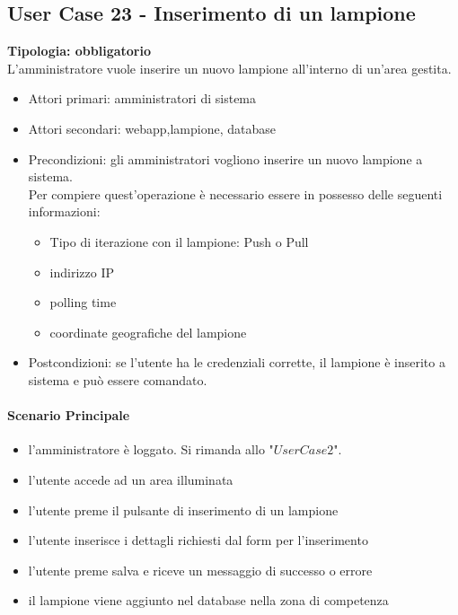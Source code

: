 \documentclass[12pt]{article}
\begin{document}
\subsection{User Case 23 - Inserimento di un lampione}
\textbf{Tipologia: obbligatorio}\\
L'amministratore vuole inserire un nuovo lampione all'interno di un'area gestita.
\begin{itemize}
	\item Attori primari: amministratori di sistema
	\item Attori secondari: webapp,lampione, database
	\item Precondizioni: gli amministratori vogliono inserire un nuovo lampione a sistema.\\
	 Per compiere quest'operazione è necessario essere in possesso delle seguenti informazioni: 
	\begin{itemize}
		\item Tipo di iterazione con il lampione: Push o Pull
		\item indirizzo IP
		\item polling time
		\item coordinate geografiche del lampione
	\end{itemize}
	\item Postcondizioni: se l'utente ha le credenziali corrette, il lampione è inserito a sistema e può essere comandato.
\end{itemize}
\paragraph{Scenario Principale}
\begin{itemize}
	\item l'amministratore è loggato. Si rimanda allo "$User Case 2$".
	\item l'utente accede ad un area illuminata
	\item l'utente preme il pulsante di inserimento di un lampione
	\item l'utente inserisce i dettagli richiesti dal form per l'inserimento
	\item l'utente preme salva e riceve un messaggio di successo o errore
	\item il lampione viene aggiunto nel database nella zona di competenza
\end{itemize}
\end{document}
